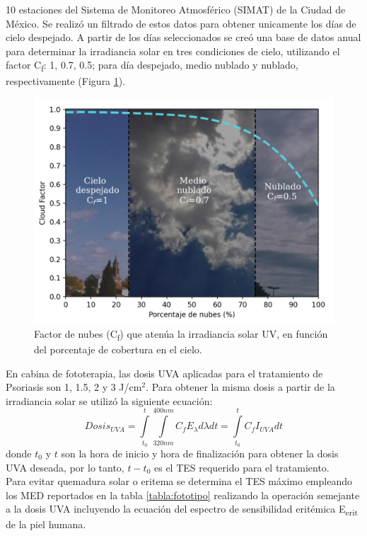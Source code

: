 \documentclass{article}
\begin{document}
\begin{multicols}{2}
 10 estaciones del Sistema de Monitoreo Atmosférico (SIMAT) de la Ciudad de México. Se realizó un filtrado de estos datos para
 obtener unicamente los días de cielo despejado. A partir de los días seleccionados se creó una base de datos anual para determinar
  la irradiancia solar en tres condiciones de cielo, utilizando el factor C\textsubscript{f}: 1, 0.7, 0.5; para día despejado, medio nublado y nublado, respectivamente
   (Figura \ref{fig:cloud}).
 \begin{figure}[H]
    \centering
    \includegraphics[scale=0.68]{images/nubes.png}
    \caption{Factor de nubes (C\textsubscript{f}) que atenúa la irradiancia solar UV, en
    función del porcentaje de cobertura en el cielo. }
    \label{fig:cloud}
\end{figure}
En cabina de fototerapia, las dosis UVA aplicadas para el tratamiento de Psoriasis son 1, 1.5, 2 y 3 J/cm$^2$. 
Para obtener la misma dosis a partir de la irradiancia solar se utilizó la siguiente ecuación:
\begin{equation*}
    Dosis_{UVA}=\int\limits_{t_0}^t\int\limits_{320nm}^{400nm} C_f E_{\lambda} d\lambda dt =\int\limits_{t_0}^{t} C_f I_{UVA}dt
\end{equation*}
donde $t_0$ y $t$ son la hora de inicio y hora de finalización para obtener la dosis UVA deseada, 
por lo tanto, $t-t_0$ es el TES requerido para el tratamiento.\\ Para evitar quemadura solar o eritema se determina el TES máximo 
empleando los MED reportados en la tabla \ref{tabla:fototipo} realizando la operación semejante a la dosis UVA incluyendo la ecuación del espectro de sensibilidad eritémica E\textsubscript{erit} de la piel humana.

\end{multicols}
\end{document}

